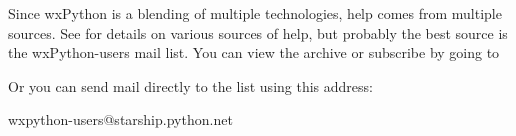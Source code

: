 Since wxPython is a blending of multiple technologies, help comes from
multiple sources.  See
 for details on
various sources of help, but probably the best source is the
wxPython-users mail list.  You can view the archive or subscribe by
going to


Or you can send mail directly to the list using this address:

wxpython-users@starship.python.net






